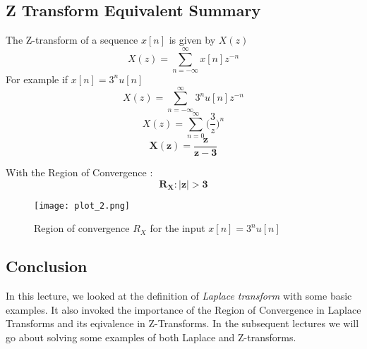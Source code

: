 \subsection{Z Transform Equivalent Summary}
The Z-transform of a sequence $x[n]$ is given by $X(z)$
\[
X(z) = \sum_{n=-\infty}^{\infty}{x[n]z^{-n}}
\]
For example if $x[n] = 3^{n}u[n]$
\[
X(z) = \sum_{n=-\infty}^{\infty}{3^{n}u[n]z^{-n}}
\]\[
X(z) = \sum_{n=0}^{\infty}{{(\frac{3}{z}})^{n}}
\]\[
	\mathbf{X(z) = \frac{z}{z-3}}
\]

With the Region of Convergence :
\[
	\mathbf{R_X : |z| > 3}
\]
\begin{figure}[h!]
\begin{center}
\texttt{[image: plot\_2.png]}
\end{center}
\caption{Region of convergence $R_X$ for the input  $x[n] = 3^{n}u[n]$}
\end{figure}

\subsection{Conclusion}
In this lecture, we looked at the definition of \textit{Laplace transform} with some basic examples. It also invoked the importance of the Region of Convergence in Laplace Transforms and its eqivalence in Z-Transforms. In the subsequent lectures we will go about solving some examples of both Laplace and Z-transforms.







                



                     

